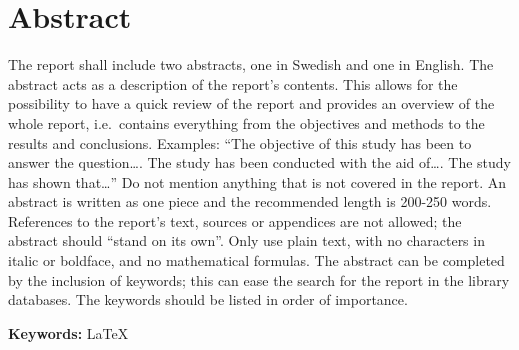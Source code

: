 \section*{Abstract}\label{sec:abstract}
The report shall include two abstracts, one in Swedish and one in English. The abstract acts as a
description of the report’s contents. This allows for the possibility to have a quick review of the
report and provides an overview of the whole report, i.e.\ contains everything from the objectives
and methods to the results and conclusions. Examples: ``The objective of this study has been to
answer the question\dots. The study has been conducted with the aid of\dots. The study has shown
that\dots'' Do not mention anything that is not covered in the report. An abstract is written as one
piece and the recommended length is 200-250 words. References to the report's text, sources or
appendices are not allowed; the abstract should ``stand on its own''. Only use plain text, with no
characters in italic or boldface, and no mathematical formulas. The abstract can be completed by the
inclusion of keywords; this can ease the search for the report in the library databases. The
keywords should be listed in order of importance.

\textbf{Keywords:} LaTeX 
